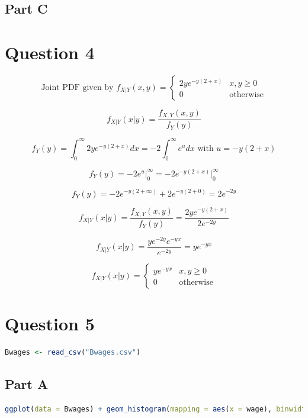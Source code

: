 \documentclass[letterpaper]{article}
\begin{document}
\subsection*{Part C}

\newpage

\section*{Question 4}

$$\text{Joint PDF given by } f_{X|Y}(x, y) = \begin{cases} 2ye^{-y(2+x)} & x, y \geq 0 \\ 0  & \text{otherwise} \end{cases}$$

$$f_{X|Y}(x|y) = \frac{f_{X,Y}(x, y)}{f_Y(y)}$$

$$f_Y(y) = \int_0^{\infty} 2ye^{-y(2+x)} dx = -2 \int_0^{\infty} e^u dx \text{ with } u = -y(2+x)$$

$$f_Y(y) = -2 e^u \Big|_0^{\infty} = -2 e^{-y(2+x)} \Big|_0^{\infty}$$

$$f_Y(y) = -2 e^{-y(2+ \infty)} + 2 e^{-y(2+0)} = 2 e^{-2y}$$

$$f_{X|Y}(x|y) = \frac{f_{X,Y}(x, y)}{f_Y(y)} = \frac{2ye^{-y(2+x)}}{2 e^{-2y}}$$

$$f_{X|Y}(x|y) = \frac{y e^{-2y} e^{-yx}}{e^{-2y}} = y e^{-yx}$$

$$f_{X|Y}(x|y) = \begin{cases} y e^{-yx} & x, y \geq 0 \\ 0 & \text{otherwise} \end{cases}$$

\newpage

\section*{Question 5}

\begin{lstlisting}[language=R]
    Bwages <- read_csv("Bwages.csv")
\end{lstlisting}

\subsection*{Part A}

\begin{lstlisting}[language=R]
    ggplot(data = Bwages) + geom_histogram(mapping = aes(x = wage), binwidth = 3) + xlab("Wages") + ylab("Count") + ggtitle("Wage Histogram")
\end{lstlisting}
\end{document}
